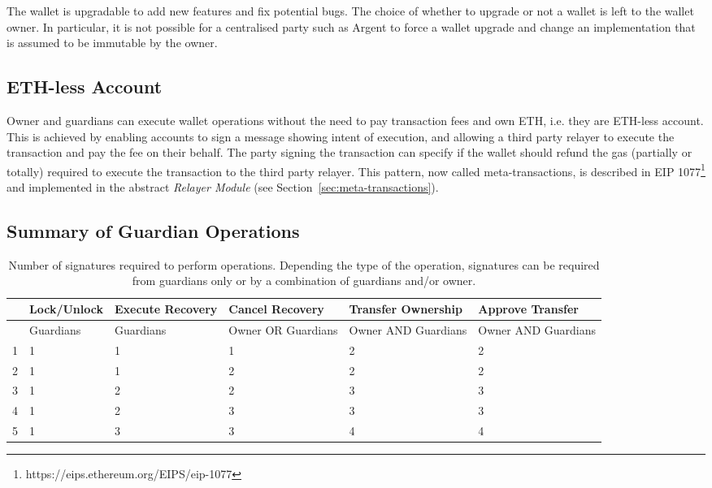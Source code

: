 \documentclass[12pt]{article}
\begin{document}
The wallet is upgradable to add new features and fix potential bugs. The choice of whether to upgrade or not a wallet is left to the wallet owner. In particular, it is not possible for a centralised party such as Argent to force a wallet upgrade and change an implementation that is assumed to be immutable by the owner.

\subsection{ETH-less Account}
\label{sec:eth-less-account}

Owner and guardians can execute wallet operations without the need to pay transaction fees and own ETH, i.e. they are ETH-less account. This is achieved by enabling accounts to sign a message showing intent of execution, and allowing a third party relayer to execute the transaction and pay the fee on their behalf. The party signing the transaction can specify if the wallet should refund the gas (partially or totally) required to execute the transaction to the third party relayer. This pattern, now called meta-transactions, is described in EIP 1077\footnote{https://eips.ethereum.org/EIPS/eip-1077} and implemented in the abstract \emph{Relayer Module} (see Section~\ref{sec:meta-transactions}). 

\subsection{Summary of Guardian Operations}
\begin{table}[ht]
    \begin{tabular}{ |c|m{6em}|m{6em}|m{6em}|m{6em}|m{6em}| }
     \hline
       & Lock/Unlock & Execute \newline Recovery & Cancel  \newline Recovery & Transfer Ownership & Approve Transfer \\
     \hline \hline
       & Guardians & Guardians & Owner OR Guardians & Owner AND Guardians & Owner AND Guardians \\
     \hline
     1 & 1 & 1 & 1 & 2 & 2 \\
     2 & 1 & 1 & 2 & 2 & 2 \\
     3 & 1 & 2 & 2 & 3 & 3 \\
     4 & 1 & 2 & 3 & 3 & 3 \\
     5 & 1 & 3 & 3 & 4 & 4 \\
     \hline

    \end{tabular}
    \caption{Number of signatures required to perform operations. Depending the type of the operation, signatures can be required from guardians only or by a combination of guardians and/or owner.}
\end{table}
\end{document}
